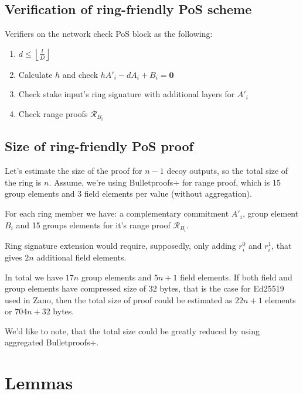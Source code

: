\documentclass{article}
\newcommand{\floor}[1]{\left\lfloor #1 \right\rfloor}
\numberwithin{figure}{section}
\begin{document}
\subsection{Verification of ring-friendly PoS scheme}
Verifiers on the network check PoS block as the following:

\begin{enumerate}
    \item $d \leq \floor{\frac{l}{D}}$
    
    \item Calculate $h$ and check $h A'_i - d A_i + B_i = \mathbf{0}$
    
    \item Check stake input's ring signature with additional layers for $A'_i$
    
    \item Check range proofs $\mathcal{R}_B_i$
\end{enumerate}


\subsection{Size of ring-friendly PoS proof}

Let's estimate the size of the proof for $n-1$ decoy outputs, so the total size of the ring is $n$. Assume, we're using Bulletproofs+ for range proof, which is 15 group elements and 3 field elements per value (without aggregation).

For each ring member we have: a complementary commitment $A'_i$, group element $B_i$ and 15 groups elements for it's range proof $\mathcal{R}_B_i$.

Ring signature extension would require, supposedly, only adding $r^0_i$ and $r^1_i$, that gives $2n$ additional field elements.

In total we have $17n$ group elements and $5n+1$ field elements. If both field and group elements have compressed size of 32 bytes, that is the case for Ed25519 used in Zano, then the total size of proof could be estimated as $22n+1$ elements or $704n+32$ bytes.

We'd like to note, that the total size could be greatly reduced by using aggregated Bulletproofs+.


%
%
\printbibliography



\newpage
\appendix
\section{Lemmas}
\end{document}
